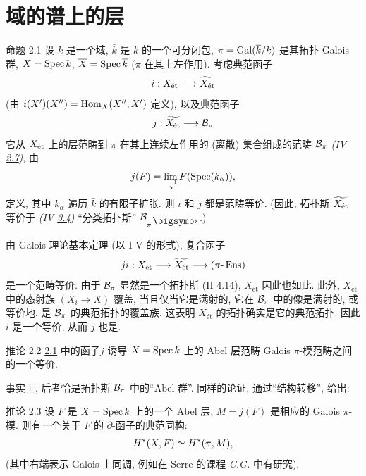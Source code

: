 \section{域的谱上的层}\pageoriginale

\begin{enonce*}{命题 2.1}
设 $k$ 是一个域, $\bar{k}$ 是 $k$ 的一个可分闭包,
$\pi = \operatorname{Gal}(\overline{k}/k)$ 是其拓扑 Galois 群,
$X=\operatorname{Spec} k$, $\overline{X}=\operatorname{Spec}\overline{k}$ ($\pi$ 在其上左作用).
考虑典范函子
$$
i : X_{\text{\rm ét}} \to \widetilde{X_{\text{\rm ét}}}
$$
(由 $i(X')(X'')=\operatorname{Hom}_X(X'',X')$ 定义), 以及典范函子
$$
j : \widetilde{X_{\text{\rm ét}}} \to \Bb_{\pi}
$$
它从 $X_{\text{\rm ét}}$ 上的层范畴到 $\pi$ 在其上连续左作用的
(离散) 集合组成的范畴 ${\mathcal B}_{\pi}$
\emph{(\cf IV \hyperref[IV.subsec2.7]{2.7})}, 由
$$
j(F) = \varinjlim_{\alpha} F(\operatorname{Spec}(k_{\alpha})) {},
$$
定义, 其中 $k_{\alpha}$ 遍历 $\bar{k}$ 的有限子扩张.
则 $i$ 和 $j$ 都是范畴等价.
(因此, 拓扑斯 $\widetilde{X_{\text{\rm ét}}}$
等价于 \emph{(IV \hyperref[IV.subsec3.4]{3.4})}
“分类拓扑斯” $\Bb_{\pi^{\bigdot}}$.)
\end{enonce*}

由 Galois 理论基本定理 (以 \SGA I V 的形式), 复合函子
$$
ji : X_{\text{\rm ét}} \to \widetilde{X_{\text{ét}}} \to (\pi\text{-}\Ens)
$$
是一个范畴等价. 由于 ${\mathcal B}_{\pi}$ 显然是一个拓扑斯 (II 4.14),
$X_{\text{ét}}$ 因此也如此.
此外, $X_{\text{ét}}$ 中的态射族 $(X_i\to X)$ 覆盖,
当且仅当它是满射的, \ie 它在 ${\mathcal B}_{\pi}$ 中的像是满射的,
或等价地, 是 ${\mathcal B}_{\pi}$ 的典范拓扑的覆盖族.
这表明 $X_{\text{ét}}$ 的拓扑确实是它的典范拓扑.
因此 $i$ 是一个等价, 从而 $j$ 也是.

\begin{enonce*}{推论 2.2}
\hyperref[VIII.prop2.1]{2.1} 中的函子\pageoriginale $j$
诱导 $X=\operatorname{Spec} k$ 上的 Abel 层范畴 Galois $\pi$-模范畴之间的一个等价.
\end{enonce*}

事实上, 后者恰是拓扑斯 ${\mathcal B}_{\pi}$ 中的“Abel 群”.
同样的论证, 通过“结构转移”, 给出:

\begin{enonce*}{推论 2.3}
设 $F$ 是 $X=\operatorname{Spec} k$ 上的一个 Abel 层,
$M=j(F)$ 是相应的 Galois $\pi$-模.
则有一个关于 $F$ 的 $\partial$-函子的典范同构:
$$
H^{\ast} (X, F) \simeq H^{\ast} (\pi, M){},
$$
(其中右端表示 Galois 上同调, 例如在 Serre 的课程 \emph{C.G.} 中有研究).
\end{enonce*}

